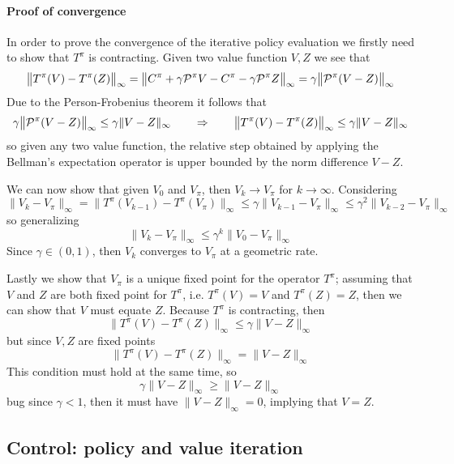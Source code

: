 	\paragraph{Proof of convergence} In order to prove the convergence of the iterative policy evaluation we firstly need to show that $T^\pi$ is  contracting. Given two value function $V,Z$ we see that
	\[ \big\|T^\pi(V) - T^\pi(Z) \big\|_\infty = \big\|C^\pi + \gamma \mathcal P^\pi V - C^\pi - \gamma \mathcal P^\pi Z \big\|_\infty = \gamma \big\| \mathcal P^\pi(V-Z) \big\|_\infty \]
	Due to the Person-Frobenius theorem it follows that
	\[ \gamma \big\| \mathcal P^\pi(V-Z) \big\|_\infty \leq \gamma \|V-Z\|_\infty \qquad \Rightarrow \qquad \big\|T^\pi(V) - T^\pi(Z) \big\|_\infty \leq \gamma \|V - Z\|_\infty \]
	so given any two value function, the relative step obtained by applying the Bellman's expectation operator is upper bounded by the norm difference $V-Z$.
	
	We can now show that given $V_0$ and $V_\pi$,  then $V_k \rightarrow V_\pi$ for $k \rightarrow \infty$. Considering
	\[ \big\| V_k - V_\pi \big\|_\infty = \big\| T^\pi(V_{k-1}) - T^\pi(V_\pi)\big\|_\infty \leq \gamma \big\| V_{k-1} - V_\pi \big\|_\infty \leq \gamma^2 \big\| V_{k-2} - V_\pi \big\|_\infty \]
	so generalizing
	\[ \big\| V_k - V_\pi \big\|_\infty \leq \gamma^k \big\|V_0 - V_\pi\big\|_\infty \] 
	Since $\gamma \in (0,1)$, then $V_k$ converges to $V_\pi$ at a geometric rate.
	
	Lastly we show that $V_\pi$ is a unique fixed point for the operator $T^\pi$; assuming that $V$ and $Z$ are both fixed point for $T^\pi$, i.e. $T^\pi(V) = V$ and $T^\pi(Z) = Z$, then we can show that $V$ must equate $Z$. Because $T^\pi$ is contracting, then
	\[ \big\|T^\pi(V) - T^\pi(Z) \big\|_\infty \leq \gamma \|V- Z\|_\infty \]
	but since $V,Z$ are fixed points
	\[ \big\|T^\pi(V) - T^\pi(Z) \big\|_\infty = \|V- Z\|_\infty \]
	This condition must hold at the same time, so
	\[ \gamma \|V- Z\|_\infty \geq \|V- Z\|_\infty \]
	bug since $\gamma < 1$, then it must have $\|V-Z\|_\infty = 0$, implying that $V=Z$.
	
\subsection{Control: policy and value iteration} \label{sec:policyiteration}

